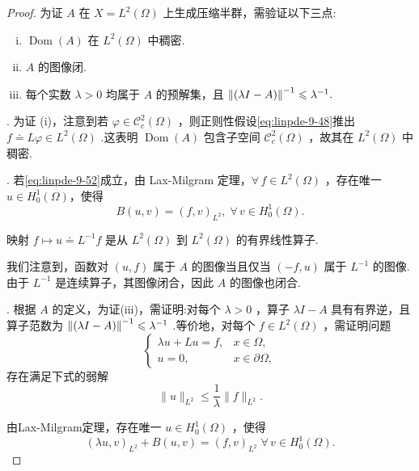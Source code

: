 \begin{proof}
为证 $A$ 在 $X = {L}^{2}\left( \Omega \right)$ 上生成压缩半群，需验证以下三点:
\begin{enumerate}[(i)]
    \item $\operatorname{Dom}\left( A\right)$ 在 ${L}^{2}\left( \Omega \right)$ 中稠密.
    \item $A$ 的图像闭.
    \item 每个实数 $\lambda  > 0$ 均属于 $A$ 的预解集，且 $\norm{\left( \lambda I - A\right) }^{-1} \leqslant  {\lambda }^{-1}.$
\end{enumerate}
. 为证 (i)，注意到若 $\varphi  \in  {\mathcal{C}}_{c}^{2}\left( \Omega \right)$ ，则正则性假设\eqref{eq:linpde-9-48}推出 $f \doteq  {L\varphi } \in  {L}^{2}\left( \Omega \right)$ .这表明 $\operatorname{Dom}\left( A\right)$ 包含子空间 ${\mathcal{C}}_{c}^{2}\left( \Omega \right)$ ，故其在 ${L}^{2}\left( \Omega \right)$ 中稠密.

. 若\eqref{eq:linpde-9-52}成立，由 Lax-Milgram 定理，$\forall\, f \in  {L}^{2}\left( \Omega \right)$ ，存在唯一 $u \in  {H}_{0}^{1}\left( \Omega \right)$，使得
\[
B\left(  {u,v}\right)   = {\left( f,v\right) }_{{L}^{2}},\;\forall\,v \in  {H}_{0}^{1}\left( \Omega \right) .
\]

映射 $f \mapsto  u \doteq  {L}^{-1}f$ 是从 ${L}^{2}\left( \Omega \right)$ 到 ${L}^{2}\left( \Omega \right)$ 的有界线性算子.

我们注意到，函数对 $\left( {u,f}\right)$ 属于 $A$ 的图像当且仅当 $\left( {-f,u}\right)$ 属于 ${L}^{-1}$ 的图像.由于 ${L}^{-1}$ 是连续算子，其图像闭合，因此 $A$ 的图像也闭合.

. 根据 $A$ 的定义，为证(iii)，需证明:对每个 $\lambda  > 0$ ，算子 ${\lambda I} - A$ 具有有界逆，且算子范数为 $\norm{\left( \lambda I - A\right) }^{-1} \leqslant  {\lambda }^{-1}$ .等价地，对每个 $f \in  {L}^{2}\left( \Omega \right)$ ，需证明问题
\begin{equation}\tag{9.53}\label{eq:linpde-9-53}
\begin{cases} {\lambda u} + {Lu}  = f, & x \in  \Omega , \\  u  = 0, & x \in  \partial \Omega , \end{cases}
\end{equation}
存在满足下式的弱解
\begin{equation}\tag{9.54}\label{eq:linpde-9-54}
\| u{\| }_{{L}^{2}} \leq  \frac{1}{\lambda }\| f{\| }_{{L}^{2}}.
\end{equation}

由Lax-Milgram定理，存在唯一 $u \in  {H}_{0}^{1}\left( \Omega \right)$ ，使得
\begin{equation}\tag{9.55}\label{eq:linpde-9-55}
{\left( \lambda u,v\right) }_{{L}^{2}} + B\left(  {u,v}\right)   = {\left( f,v\right) }_{{L}^{2}}\;\forall\,v \in  {H}_{0}^{1}\left( \Omega \right) .
\end{equation}


\end{proof}
